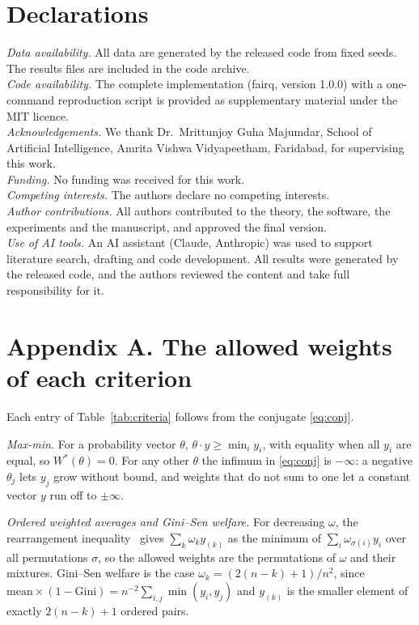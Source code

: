 \documentclass[11pt,a4paper]{article}
\begin{document}
\section*{Declarations}
\noindent\emph{Data availability.} All data are generated by the released code from fixed seeds. The
results files are included in the code archive.\\[3pt]
\emph{Code availability.} The complete implementation (fairq, version 1.0.0) with a one-command
reproduction script is provided as supplementary material under the MIT licence.\\[3pt]
\emph{Acknowledgements.} We thank Dr.~Mrittunjoy Guha Majumdar, School of Artificial Intelligence,
Amrita Vishwa Vidyapeetham, Faridabad, for supervising this work.\\[3pt]
\emph{Funding.} No funding was received for this work.\\[3pt]
\emph{Competing interests.} The authors declare no competing interests.\\[3pt]
\emph{Author contributions.} All authors contributed to the theory, the software, the experiments and
the manuscript, and approved the final version.\\[3pt]
\emph{Use of AI tools.} An AI assistant (Claude, Anthropic) was used to support literature search,
drafting and code development. All results were generated by the released code, and the authors
reviewed the content and take full responsibility for it.

\section*{Appendix A. The allowed weights of each criterion}

Each entry of Table~\ref{tab:criteria} follows from the conjugate \eqref{eq:conj}.

\noindent\emph{Max-min.} For a probability vector $\theta$, $\theta\cdot y\ge\min_iy_i$, with equality
when all $y_i$ are equal, so $W^*(\theta)=0$. For any other $\theta$ the infimum in \eqref{eq:conj} is
$-\infty$: a negative $\theta_j$ lets $y_j$ grow without bound, and weights that do not sum to one let
a constant vector $y$ run off to $\pm\infty$.

\noindent\emph{Ordered weighted averages and Gini--Sen welfare.} For decreasing $\omega$, the
rearrangement inequality~\cite{hardy1952inequalities} gives $\sum_k\omega_ky_{(k)}$ as the minimum of
$\sum_i\omega_{\sigma(i)}y_i$ over all permutations $\sigma$, so the allowed weights are the
permutations of $\omega$ and their mixtures. Gini--Sen welfare is the case
$\omega_k=(2(n-k)+1)/n^2$, since $\mathrm{mean}\times(1-\text{Gini})=n^{-2}\sum_{i,j}\min(y_i,y_j)$ and
$y_{(k)}$ is the smaller element of exactly $2(n-k)+1$ ordered pairs.
\end{document}
